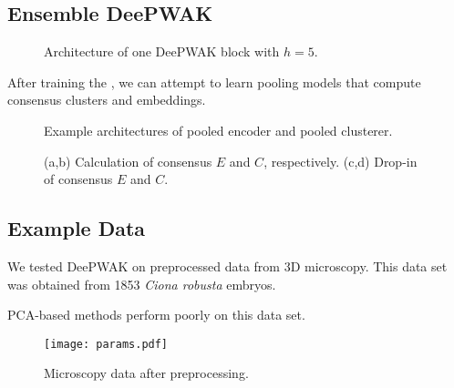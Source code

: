 \subsection{Ensemble DeePWAK}





\begin{figure}
  
        
         \caption{Architecture of one DeePWAK block with $h=5$.}
         \label{fig:}
\end{figure}

After training the \DeePWAKBlock, we can attempt to learn pooling models that compute consensus clusters and embeddings.

\begin{figure}
  
  \caption{
    Example architectures of pooled encoder and pooled clusterer.
  }
  \label{fig:}
\end{figure}

\begin{figure}

     \begin{subfigure}[b]{0.5\textwidth}
        
         \caption{}
         \label{fig:}
     \end{subfigure}
     \hfill
     \begin{subfigure}[b]{\textwidth}
       
       \caption{}
       \label{fig:}
     \end{subfigure}

  \vspace{1cm}
     
     \begin{subfigure}[b]{0.5\textwidth}
       
         \caption{}
         \label{fig:}
     \end{subfigure}
     \hfill
     \begin{subfigure}[b]{0.5\textwidth}
        
         \caption{}
         \label{fig:}
     \end{subfigure}

     \caption{(a,b) Calculation of consensus $E$ and $C$, respectively.
     (c,d) Drop-in of consensus $E$ and $C$.}
     \label{fig:}
\end{figure}

\subsection{Example Data}
We tested DeePWAK on preprocessed data from 3D microscopy.
This data set was obtained from 1853 \textit{Ciona robusta} embryos.

PCA-based methods perform poorly on this data set.


\begin{figure}
  \texttt{[image: params.pdf]}
    \caption{Microscopy data after preprocessing. }
    \label{fig:}
\end{figure}

